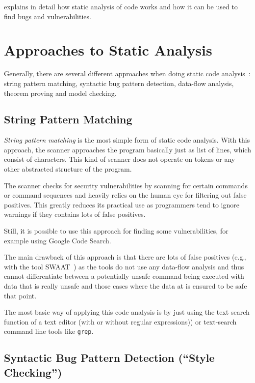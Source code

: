 \cite{chess-west} explains in detail how static analysis of code works and how it can be used to find bugs and vulnerabilities.


\section{Approaches to Static Analysis}
Generally, there are several different approaches when doing static code analysis~\cite{comparison-of-bug-finding-tools}: string pattern matching, syntactic bug pattern detection, data-flow analysis, theorem proving and model checking.


\subsection{String Pattern Matching}

\emph{String pattern matching} is the most simple form of static code analysis. With this approach, the scanner approaches the program basically just as list of lines, which consist of characters. This kind of scanner does not operate on tokens or any other abstracted structure of the program.

The scanner checks for security vulnerabilities by scanning for certain commands or command sequences and heavily relies on the human eye for filtering out false positives. This greatly reduces its practical use as programmers tend to ignore warnings if they contains lots of false positives.~\cite{understanding-value}

Still, it is possible to use this approach for finding some vulnerabilities, for example using Google Code Search.~\cite{google-code-search}

The main drawback of this approach is that there are lots of false positives (e.g., with the tool SWAAT~\cite{swaat}) as the tools do not use any data-flow analysis and thus cannot differentiate between a potentially unsafe command being executed with data that is really unsafe and those cases where the data at is ensured to be safe that point.

The most basic way of applying this code analysis is by just using the text search function of a text editor (with or without regular expressions)) or text-search command line tools like \texttt{grep}.


\subsection{Syntactic Bug Pattern Detection (``Style Checking'')}

